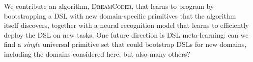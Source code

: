 \documentclass{article}
\newcommand{\systemEnding}{\textsc{DreamCoder}}
\begin{document}
We contribute an algorithm, \systemEnding, that learns to program by
bootstrapping a DSL with new domain-specific primitives that the algorithm
itself discovers, together with a neural recognition model that learns to
efficiently deploy the DSL on new tasks. %
One future direction is DSL meta-learning: can we find a
\emph{single} universal primitive set that could bootstrap DSLs for
new domains, including the domains considered here,  but also many others?



\end{document}
